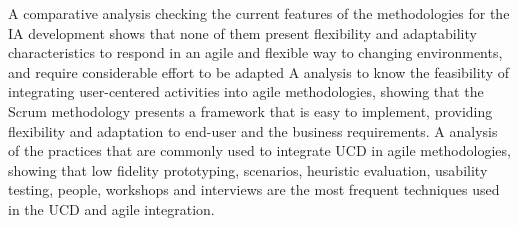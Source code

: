 A comparative analysis checking the current features of the methodologies for the IA development shows that none of them present flexibility and adaptability characteristics to respond in an agile and flexible way to changing environments, and require considerable effort to be adapted
A analysis to know the feasibility of integrating user-centered activities into agile methodologies, showing that the Scrum methodology presents a framework that is easy to implement, providing flexibility and adaptation to end-user and the business requirements.
A analysis of the practices that are commonly used to integrate UCD in agile methodologies, showing that low fidelity prototyping, scenarios, heuristic evaluation, usability testing, people, workshops and interviews are the most frequent techniques used in the UCD and agile integration.
\citep{PDFAnAgi97:online}

